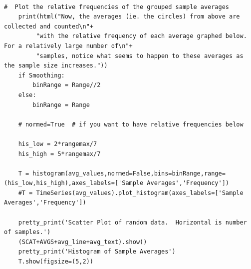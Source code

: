\documentclass[10pt,]{book}
\theoremstyle{plain}
\theoremstyle{definition}
\theoremstyle{definition}
\theoremstyle{definition}
\numberwithin{equation}{section}
\begin{document}
\begin{lstlisting}[style=sageinput]
    
#  Plot the relative frequencies of the grouped sample averages
    print(html("Now, the averages (ie. the circles) from above are collected and counted\n"+
         "with the relative frequency of each average graphed below.  For a relatively large number of\n"+
         "samples, notice what seems to happen to these averages as the sample size increases."))
    if Smoothing:
        binRange = Range//2
    else:
        binRange = Range
    
    # normed=True  # if you want to have relative frequencies below
    
    his_low = 2*rangemax/7
    his_high = 5*rangemax/7
    
    T = histogram(avg_values,normed=False,bins=binRange,range=(his_low,his_high),axes_labels=['Sample Averages','Frequency']) 
    #T = TimeSeries(avg_values).plot_histogram(axes_labels=['Sample Averages','Frequency'])   
    
    pretty_print('Scatter Plot of random data.  Horizontal is number of samples.')
    (SCAT+AVGS+avg_line+avg_text).show()
    pretty_print('Histogram of Sample Averages')
    T.show(figsize=(5,2))
\end{lstlisting}
\end{document}
